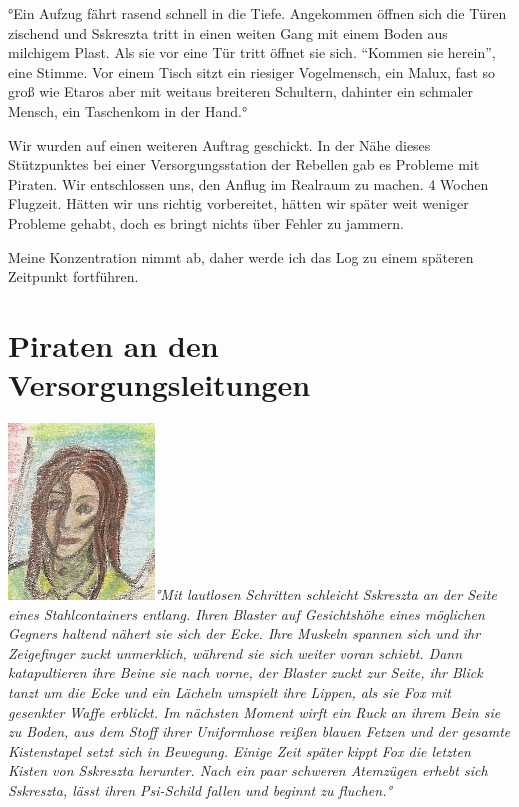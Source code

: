 \documentclass[11pt]{scrartcl}
\begin{document}
°Ein Aufzug fährt rasend schnell in die Tiefe. Angekommen öffnen sich
die Türen zischend und Sskreszta tritt in einen weiten Gang mit einem
Boden aus milchigem Plast. Als sie vor eine Tür tritt öffnet sie sich.
``Kommen sie herein'', eine Stimme. Vor einem Tisch sitzt ein riesiger
Vogelmensch, ein Malux, fast so groß wie Etaros aber mit weitaus
breiteren Schultern, dahinter ein schmaler Mensch, ein Taschenkom in der
Hand.°

Wir wurden auf einen weiteren Auftrag geschickt. In der Nähe dieses
Stützpunktes bei einer Versorgungsstation der Rebellen gab es Probleme
mit Piraten. Wir entschlossen uns, den Anflug im Realraum zu machen. 4
Wochen Flugzeit. Hätten wir uns richtig vorbereitet, hätten wir später
weit weniger Probleme gehabt, doch es bringt nichts über Fehler zu
jammern.

Meine Konzentration nimmt ab, daher werde ich das Log zu einem späteren
Zeitpunkt fortführen.

\section{Piraten an den Versorgungsleitungen}

\emph{\includegraphics{sskreszta-portrait-alt-klein.png}°Mit
lautlosen Schritten schleicht Sskreszta an der Seite eines
Stahlcontainers entlang. Ihren Blaster auf Gesichtshöhe eines möglichen
Gegners haltend nähert sie sich der Ecke. Ihre Muskeln spannen sich und
ihr Zeigefinger zuckt unmerklich, während sie sich weiter voran schiebt.
Dann katapultieren ihre Beine sie nach vorne, der Blaster zuckt zur
Seite, ihr Blick tanzt um die Ecke und ein Lächeln umspielt ihre Lippen,
als sie Fox mit gesenkter Waffe erblickt. Im nächsten Moment wirft ein
Ruck an ihrem Bein sie zu Boden, aus dem Stoff ihrer Uniformhose reißen
blauen Fetzen und der gesamte Kistenstapel setzt sich in Bewegung.
Einige Zeit später kippt Fox die letzten Kisten von Sskreszta herunter.
Nach ein paar schweren Atemzügen erhebt sich Sskreszta, lässt ihren
Psi-Schild fallen und beginnt zu fluchen.°}
\end{document}
